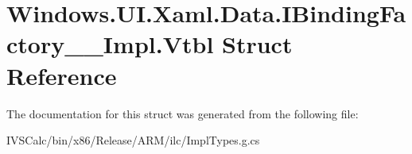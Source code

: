 \hypertarget{struct_windows_1_1_u_i_1_1_xaml_1_1_data_1_1_i_binding_factory_____impl_1_1_vtbl}{}\section{Windows.\+U\+I.\+Xaml.\+Data.\+I\+Binding\+Factory\+\_\+\+\_\+\+Impl.\+Vtbl Struct Reference}
\label{struct_windows_1_1_u_i_1_1_xaml_1_1_data_1_1_i_binding_factory_____impl_1_1_vtbl}


The documentation for this struct was generated from the following file\+:\begin{DoxyCompactItemize}
\item 
I\+V\+S\+Calc/bin/x86/\+Release/\+A\+R\+M/ilc/Impl\+Types.\+g.\+cs\end{DoxyCompactItemize}
